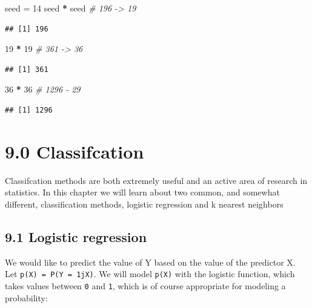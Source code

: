 \documentclass[]{article}
\newenvironment{Shaded}{\begin{snugshade}}{\end{snugshade}}
\newcommand{\DecValTok}[1]{\textcolor[rgb]{0.00,0.00,0.81}{#1}}
\newcommand{\StringTok}[1]{\textcolor[rgb]{0.31,0.60,0.02}{#1}}
\newcommand{\CommentTok}[1]{\textcolor[rgb]{0.56,0.35,0.01}{\textit{#1}}}
\newcommand{\OperatorTok}[1]{\textcolor[rgb]{0.81,0.36,0.00}{\textbf{#1}}}
\newcommand{\NormalTok}[1]{#1}
\begin{document}
\begin{Shaded}
\begin{Highlighting}[]
\NormalTok{seed =}\StringTok{ }\DecValTok{14}
\NormalTok{seed }\OperatorTok{*}\StringTok{ }\NormalTok{seed }\CommentTok{# 196 -> 19}
\end{Highlighting}
\end{Shaded}

\begin{verbatim}
## [1] 196
\end{verbatim}

\begin{Shaded}
\begin{Highlighting}[]
\DecValTok{19} \OperatorTok{*}\StringTok{ }\DecValTok{19} \CommentTok{# 361 -> 36}
\end{Highlighting}
\end{Shaded}

\begin{verbatim}
## [1] 361
\end{verbatim}

\begin{Shaded}
\begin{Highlighting}[]
\DecValTok{36} \OperatorTok{*}\StringTok{ }\DecValTok{36} \CommentTok{# 1296 - 29}
\end{Highlighting}
\end{Shaded}

\begin{verbatim}
## [1] 1296
\end{verbatim}

\section{9.0 Classifcation}\label{classifcation}

Classifcation methods are both extremely useful and an active area of
research in statistics. In this chapter we will learn about two common,
and somewhat different, classification methods, logistic regression and
k nearest neighbors

\subsection{9.1 Logistic regression}\label{logistic-regression}

We would like to predict the value of Y based on the value of the
predictor X. Let \texttt{p(X)\ =\ P(Y\ =\ 1jX)}. We will model
\texttt{p(X)} with the logistic function, which takes values between
\texttt{0} and \texttt{1}, which is of course appropriate for modeling a
probability:
\end{document}
